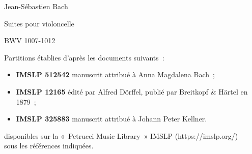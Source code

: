 \documentclass[a4paper,twoside]{article}
\renewenvironment{quote}{%
  \list{}{%
    \leftmargin=0.5cm   %
    \rightmargin=\leftmargin
  }%
  \item\relax
}{\endlist}
\begin{document}
\cleardoublepage
  \vspace*{\fill}
  \begin{center}
	\LARGE
	Jean-Sébastien Bach
	
	\bigskip
	
	\Huge
	Suites pour violoncelle
	
	\bigskip
	
	\Large
	BWV 1007-1012
	
	
	\vspace*{\fill}

	\hspace*{1.8cm}\parbox{0.8\textwidth}{%
  \large
	Partitions établies d'après les documents suivants~:

  \begin{quote}
  \begin{itemize}
    \item[] \textbf{IMSLP 512542} manuscrit attribué à Anna Magdalena Bach~;

    \item[] \textbf{IMSLP 12165} édité par Alfred Dörffel, publié par Breitkopf \& Härtel en 1879~;

    \item[] \textbf{IMSLP 325883} manuscrit attribué à Johann Peter Kellner.
  \end{itemize}
  \end{quote}
	disponibles sur la «~Petrucci Music Library~» IMSLP (\textsf{https://imslp.org/}) \\
	sous les références indiquées.
  }

  \end{center}

  \vspace*{\fill}

\newpage
\restoregeometry

\vspace*{10cm}
\end{document}
